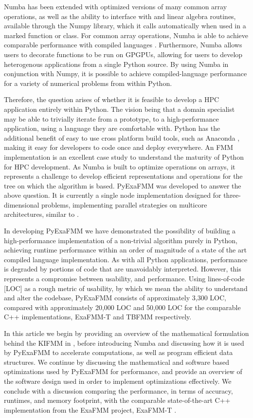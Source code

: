 \documentclass{IEEEcsmag}
\begin{document}
Numba has been extended with optimized versions of many common array operations, as well as the ability to interface with and linear algebra routines, available through the Numpy library, which it calls automatically when used in a marked function or class. For common array operations, Numba is able to achieve comparable performance with compiled languages \cite{Lam2015}. Furthermore, Numba allows users to decorate functions to be run on GPGPUs, allowing for users to develop heterogenous applications from a single Python source. By using Numba in conjunction with Numpy, it is possible to achieve compiled-language performance for a variety of numerical problems from within Python.

Therefore, the question arises of whether it is feasible to develop a HPC application entirely within Python. The vision being that a domain specialist may be able to trivially iterate from a prototype, to a high-performance application, using a language they are comfortable with. Python has the additional benefit of easy to use cross platform build tools, such as Anaconda \cite{anaconda}, making it easy for developers to code once and deploy everywhere. An FMM implementation is an excellent case study to understand the maturity of Python for HPC development. As Numba is built to optimize operations on arrays, it represents a challenge to develop efficient representations and operations for the tree on which the algorithm is based. PyExaFMM was developed to answer the above question. It is currently a single node implementation designed for three-dimensional problems, implementing parallel strategies on multicore architectures, similar to \cite{Bramas2020, Wang2021}.

In developing PyExaFMM we have demonstrated the possibility of building a high-performance implementation of a non-trivial algorithm purely in Python, achieving runtime performance within an order of magnitude of a state of the art compiled language implementation. As with all Python applications, performance is degraded by portions of code that are unavoidably interpreted. However, this represents a compromise between usability, and performance. Using lines-of-code [LOC] as a rough metric of usability, by which we mean the ability to understand and alter the codebase, PyExaFMM consists of approximately 3,300 LOC, compared with approximately 20,000 LOC and 50,000 LOC for the comparable C++ implementations, ExaFMM-T \cite{Wang2021} and TBFMM \cite{Bramas2020} respectively.

In this article we begin by providing an overview of the mathematical formulation behind the KIFMM in \cite{Ying2004}, before introducing Numba and discussing how it is used by PyExaFMM to accelerate computations, as well as program efficient data structures. We continue by discussing the mathematical and software based optimizations used by PyExaFMM for performance, and provide an overview of the software design used in order to implement optimizations effectively. We conclude with a discussion comparing the performance, in terms of accuracy, runtimes, and memory footprint, with the comparable state-of-the-art C++ implementation from the ExaFMM project, ExaFMM-T \cite{Wang2021}.
\end{document}

